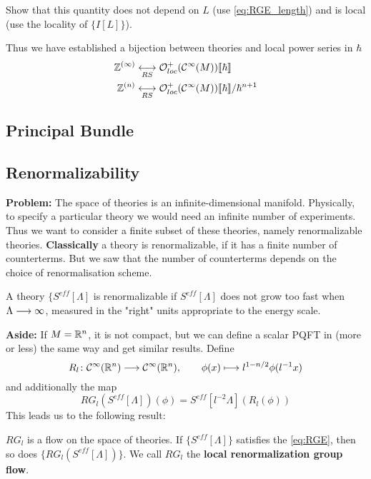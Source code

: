 \begin{ex}
  Show that this quantity does not depend on $L$ (use \eqref{eq:RGE_length}) and is local (use the locality of $\{I[L]\}$).
\end{ex}

Thus we have established a bijection between theories and local power series in $\hbar$
\begin{align}
  \mathbb{Z}^{(\infty)} &\underset{RS}{\longleftrightarrow} \mathcal{O}^+_{loc}(\mathcal{C}^{\infty}(M))\llbracket \hbar \rrbracket \\
  \mathbb{Z}^{(n)} &\underset{RS}{\longleftrightarrow} \mathcal{O}^+_{loc}(\mathcal{C}^{\infty}(M))\llbracket \hbar \rrbracket / \hbar^{n+1}
\end{align}


\subsection{Principal Bundle}
\subsection{Renormalizability}

\textbf{Problem:} The space of theories is an infinite-dimensional manifold. Physically, to specify a particular theory we would need an infinite number of experiments.\\

Thus we want to consider a finite subset of these theories, namely renormalizable theories. \textbf{Classically} a theory is renormalizable, if it has a finite number of counterterms. But we saw that the number of counterterms depends on the choice of renormalisation scheme.

\begin{axiom}
  A theory $\{S^{eff}[\Lambda]$ is renormalizable if $S^{eff}[\Lambda]$ does not grow too fast when $\Lambda \longrightarrow \infty$, measured in the "right" units appropriate to the energy scale.
\end{axiom}


\textbf{Aside:} If $M = \mathbb{R}^n$, it is not compact, but we can define a scalar PQFT in (more or less) the same way and get similar results. Define
$$ R_l \colon \Ci(\RR^n) \lra \Ci(\RR^n), \quad \quad \phi(x) \lmap l^{1-n/2} \phi(l^{-1} x) $$
and additionally the map
$$ RG_l (S^{eff}[\Lambda]) (\phi) = S^{eff}[l^{-2} \Lambda](R_l(\phi)) $$
This leads us to the following result:

\begin{lem}
  $RG_l$ is a flow on the space of theories. If $ \{S^{eff}[\Lambda]\}$ satisfies the \eqref{eq:RGE}, then so does $\{RG_l(S^{eff}[\Lambda])\}$. We call $RG_l$ the \textbf{local renormalization group flow}.
\end{lem}


